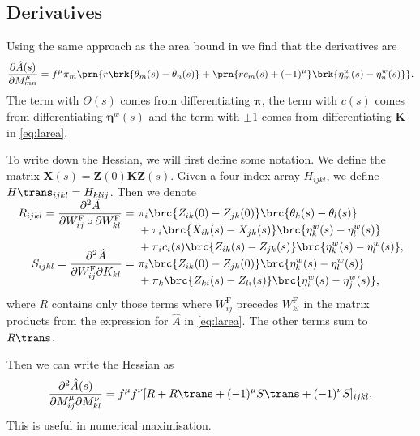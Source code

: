 \documentclass[12pt]{article}
\newcommand{\eqm}{\pi}
\newcommand{\eq}{\boldsymbol{\eqm}}
\newcommand{\fundm}{Z}
\newcommand{\fund}{\mathbf{\fundm}}
\newcommand{\etwm}{\eta^w}
\newcommand{\etw}{\boldsymbol{\eta}^w}
\newcommand{\thbm}{\theta}
\newcommand{\Wm}{W}
\newcommand{\MMdm}{M}
\newcommand{\encm}{K}
\newcommand{\enc}{\mathbf{\encm}}
\newcommand{\frgm}{\Wm^{\mathrm{F}}}
\renewcommand{\pdiff}[2]{\frac{\partial #1}{\partial #2}}
\begin{document}

\subsection{Derivatives}\label{sec:lderiv}

Using the same approach as the area bound in \cite{Lahiri2013synapse} we find that the derivatives are
%
\begin{equation}\label{eq:lAdiff}
  \pdiff{\hat{A}(s)}{\MMdm^\mu_{mn}}
     = f^\mu \eqm_m \prn{ r \brk{\thbm_m(s) - \thbm_n(s)}
     +\prn{r {c}_m(s) + (-1)^\mu} \brk{\etwm_m(s) - \etwm_n(s)} }.
\end{equation}
%
The term with $\Theta(s)$ comes from differentiating $\eq$, the term with $c(s)$ comes from differentiating $\etw(s)$ and the term with $\pm1$ comes from differentiating $\enc$ in \eqref{eq:larea}.

To write down the Hessian, we will first define some notation.
We define the matrix $\mathbf{X}(s) = \fund(0) \enc \fund(s)$.
Given a four-index array $H_{ijkl}$, we define $H\trans_{ijkl} = H_{klij}$.
Then we denote
%
\begin{equation}\label{eq:hessparts}
\begin{alignedat}{3}
    R_{ijkl} = \smash{\pdiff{^2 \hat{A}}{\frgm_{ij} \circ \partial \frgm_{kl}}} 
    &= \
    &&\eqm_i \brc{\fundm_{ik}(0) - \fundm_{jk}(0)} \brc{\thbm_k(s) - \thbm_l(s)} \\
    &&&+ \eqm_i \brc{{X}_{ik}(s) - {X}_{jk}(s)} 
          \brc{\etwm_k(s) - \etwm_l(s)} \\
    &&&+ \eqm_i {c}_i(s) \brc{\fundm_{ik}(s) - \fundm_{jk}(s)} 
          \brc{\etwm_k(s) - \etwm_l(s)},  \\
  S_{ijkl} = \smash{\pdiff{^2 \hat{A}}{\frgm_{ij} \partial \encm_{kl}} }
  &= \
    &&\eqm_i \brc{\fundm_{ik}(0) - \fundm_{jk}(0)} \brc{\etwm_k(s) - \etwm_l(s)} \\
    &&&+ \eqm_k \brc{\fundm_{ki}(s) - \fundm_{li}(s)} \brc{\etwm_i(s) - \etwm_j(s)},
\end{alignedat}
\end{equation}
%
where \(R\) contains only those terms where \( \frgm_{ij} \) precedes \( \frgm_{kl} \) in the matrix products from the expression for \( \hat{A} \) in \cref{eq:larea}.
The other terms sum to \(R\trans\).

Then we can write the Hessian as
%
\begin{equation}\label{eq:hessian}
  \pdiff{^2\hat{A}(s)}{\MMdm^\mu_{ij} \partial \MMdm^\nu_{kl}} =
     f^\mu f^\nu [R + R\trans + (-1)^\mu S\trans + (-1)^\nu S]_{ijkl}.
\end{equation}
%
This is useful in numerical maximisation.
\end{document}

